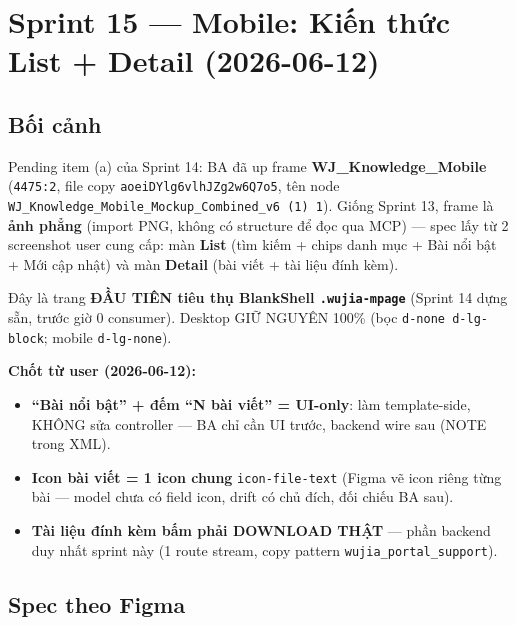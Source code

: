 \chapter{Sprint 15 --- Mobile: Kiến thức List + Detail (2026-06-12)}

\section{Bối cảnh}

Pending item (a) của Sprint 14: BA đã up frame \textbf{WJ\_Knowledge\_Mobile}
(\texttt{4475:2}, file copy \texttt{aoeiDYlg6vlhJZg2w6Q7o5}, tên node
\texttt{WJ\_Knowledge\_Mobile\_Mockup\_Combined\_v6 (1) 1}). Giống Sprint 13, frame là
\textbf{ảnh phẳng} (import PNG, không có structure để đọc qua MCP) --- spec lấy từ
2 screenshot user cung cấp: màn \textbf{List} (tìm kiếm + chips danh mục + Bài nổi
bật + Mới cập nhật) và màn \textbf{Detail} (bài viết + tài liệu đính kèm).

Đây là trang \textbf{ĐẦU TIÊN tiêu thụ BlankShell \texttt{.wujia-mpage}} (Sprint 14
dựng sẵn, trước giờ 0 consumer). Desktop GIỮ NGUYÊN 100\% (bọc
\texttt{d-none d-lg-block}; mobile \texttt{d-lg-none}).

\textbf{Chốt từ user (2026-06-12):}
\begin{itemize}
  \item \textbf{``Bài nổi bật'' + đếm ``N bài viết'' = UI-only}: làm template-side,
        KHÔNG sửa controller --- BA chỉ cần UI trước, backend wire sau (NOTE trong XML).
  \item \textbf{Icon bài viết = 1 icon chung} \texttt{icon-file-text} (Figma vẽ icon
        riêng từng bài --- model chưa có field icon, drift có chủ đích, đối chiếu BA sau).
  \item \textbf{Tài liệu đính kèm bấm phải DOWNLOAD THẬT} --- phần backend duy nhất
        sprint này (1 route stream, copy pattern \texttt{wujia\_portal\_support}).
\end{itemize}

\section{Spec theo Figma}

